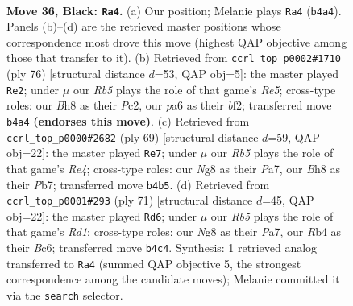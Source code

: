 \documentclass[11pt]{article}
\begin{document}
\clearpage

\begin{figure}[p]\centering
\begin{subfigure}{0.46\textwidth}\centering
\resizebox{\linewidth}{!}{%
\newchessgame
\chessboard[
  setfen={r1k3nb/p6p/P1p2p2/2P2N2/1r2P3/5RB1/8/3R2K1 b - - 3 36},
  showmover=false,
  pgfstyle=straightmove, color=movearrow, markmove={b4-a4}
]}
\caption{}
\end{subfigure}\hfill
\begin{subfigure}{0.46\textwidth}\centering
\resizebox{\linewidth}{!}{%
\newchessgame
\chessboard[
  setfen={3r2k1/3n2p1/p2P3p/1p2R3/1P6/P7/2P2b1P/1K1R4 w - - 9 39},
  showmover=false,
  pgfstyle=straightmove, color=movearrow, markmove={e5-e2}
]}
\caption{}
\end{subfigure}
\\[4pt]
\begin{subfigure}{0.46\textwidth}\centering
\resizebox{\linewidth}{!}{%
\newchessgame
\chessboard[
  setfen={6kr/pp4p1/2p4p/4r2P/PP4P1/2N5/1B1R2K1/8 b - - 1 35},
  showmover=false,
  pgfstyle=straightmove, color=movearrow, markmove={e5-e7}
]}
\caption{}
\end{subfigure}\hfill
\begin{subfigure}{0.46\textwidth}\centering
\resizebox{\linewidth}{!}{%
\newchessgame
\chessboard[
  setfen={3r3k/pp3p2/2b2N2/P7/2pP2BP/4P3/1n4P1/5RK1 b - - 0 36},
  showmover=false,
  pgfstyle=straightmove, color=movearrow, markmove={d8-d6}
]}
\caption{}
\end{subfigure}
\caption{\textbf{Move 36, Black: \texttt{Ra4}.} (a) Our position; Melanie plays \texttt{Ra4} (\texttt{b4a4}). Panels (b)--(d) are the retrieved master positions whose correspondence most drove this move (highest QAP objective among those that transfer to it). (b) Retrieved from \texttt{ccrl\_top\_p0002\#1710} (ply 76) [structural distance $d$=53, QAP obj=5]: the master played \texttt{Re2}; under $\mu$ our \emph{Rb5} plays the role of that game's \emph{Re5}; cross-type roles: our \emph{B}h8 as their \emph{P}c2, our \emph{p}a6 as their \emph{b}f2; transferred move \texttt{b4a4} \textbf{(endorses this move)}. (c) Retrieved from \texttt{ccrl\_top\_p0000\#2682} (ply 69) [structural distance $d$=59, QAP obj=22]: the master played \texttt{Re7}; under $\mu$ our \emph{Rb5} plays the role of that game's \emph{Re4}; cross-type roles: our \emph{N}g8 as their \emph{P}a7, our \emph{B}h8 as their \emph{P}b7; transferred move \texttt{b4b5}. (d) Retrieved from \texttt{ccrl\_top\_p0001\#293} (ply 71) [structural distance $d$=45, QAP obj=22]: the master played \texttt{Rd6}; under $\mu$ our \emph{Rb5} plays the role of that game's \emph{Rd1}; cross-type roles: our \emph{N}g8 as their \emph{P}a7, our \emph{R}b4 as their \emph{B}c6; transferred move \texttt{b4c4}. Synthesis: 1 retrieved analog transferred to \texttt{Ra4} (summed QAP objective 5, the strongest correspondence among the candidate moves); Melanie committed it via the \texttt{search} selector.}
\label{fig:thought-m71}
\end{figure}
\end{document}
